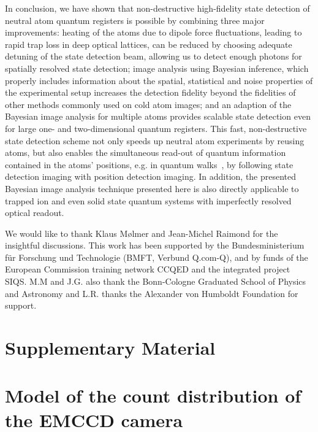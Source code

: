 \documentclass[aps,prl,twocolumn,english,showpacs]{revtex4-1}
\begin{document}
In conclusion, we have shown that non-destructive high-fidelity state detection of neutral atom quantum registers is possible by combining three major improvements: heating of the atoms due to dipole force fluctuations, leading to rapid trap loss in deep optical lattices, can be reduced by choosing adequate detuning of the state detection beam, allowing us to detect enough photons for spatially resolved state detection; image analysis using Bayesian inference, which properly includes information about the spatial, statistical and noise properties of the experimental setup increases the detection fidelity beyond the fidelities of other methods commonly used on cold atom images; and an adaption of the Bayesian image analysis for multiple atoms provides scalable state detection even for large one- and two-dimensional quantum registers. This fast, non-destructive state detection scheme not only speeds up neutral atom experiments by reusing atoms, but also enables the simultaneous read-out of quantum information contained in the atoms' positions, e.g. in quantum walks~\cite{karski2009quantum}, by following state detection imaging with position detection imaging. In addition, the presented Bayesian image analysis technique presented here is also directly applicable to trapped ion and even solid state quantum systems with imperfectly resolved optical readout. 

We would like to thank Klaus M{\o}lmer and Jean-Michel Raimond for the insightful discussions. This work has been supported by the Bundesministerium f\"ur Forschung und Technologie (BMFT, Verbund Q.com-Q), and by funds of the European Commission training network CCQED and the integrated project SIQS. M.M and J.G. also thank the Bonn-Cologne Graduated School of Physics and Astronomy and L.R. thanks the Alexander von Humboldt Foundation for support.

\newpage

\renewcommand{\thefigure}{S.\arabic{figure}}
\renewcommand{\theequation}{S.\arabic{equation}}
\setcounter{figure}{0}    
\setcounter{equation}{0}    

\section*{Supplementary Material}

\section{Model of the count distribution of the EMCCD camera} \label{sec:EMCCDmodel}
\end{document}

